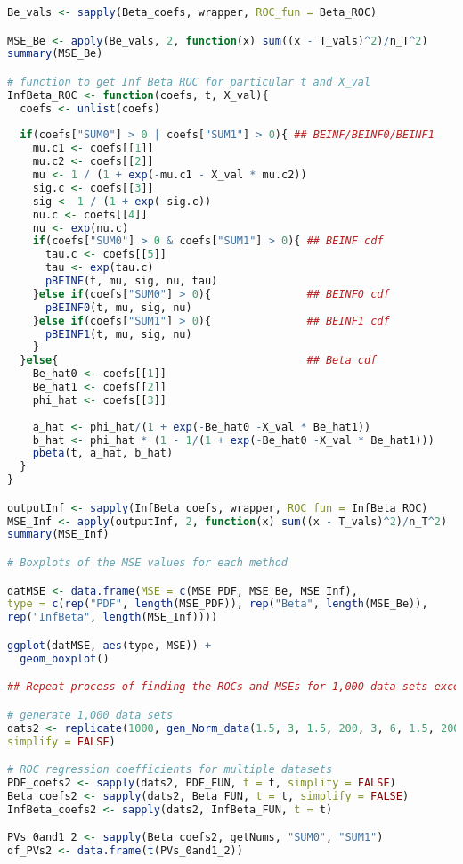 \documentclass{article}
\begin{document}
\begin{lstlisting}[language=R]
Be_vals <- sapply(Beta_coefs, wrapper, ROC_fun = Beta_ROC)

MSE_Be <- apply(Be_vals, 2, function(x) sum((x - T_vals)^2)/n_T^2)
summary(MSE_Be)

# function to get Inf Beta ROC for particular t and X_val
InfBeta_ROC <- function(coefs, t, X_val){
  coefs <- unlist(coefs)
  
  if(coefs["SUM0"] > 0 | coefs["SUM1"] > 0){ ## BEINF/BEINF0/BEINF1
    mu.c1 <- coefs[[1]]
    mu.c2 <- coefs[[2]]
    mu <- 1 / (1 + exp(-mu.c1 - X_val * mu.c2))
    sig.c <- coefs[[3]]
    sig <- 1 / (1 + exp(-sig.c))
    nu.c <- coefs[[4]]
    nu <- exp(nu.c)
    if(coefs["SUM0"] > 0 & coefs["SUM1"] > 0){ ## BEINF cdf
      tau.c <- coefs[[5]]
      tau <- exp(tau.c)
      pBEINF(t, mu, sig, nu, tau)
    }else if(coefs["SUM0"] > 0){               ## BEINF0 cdf
      pBEINF0(t, mu, sig, nu)
    }else if(coefs["SUM1"] > 0){               ## BEINF1 cdf
      pBEINF1(t, mu, sig, nu)
    } 
  }else{                                       ## Beta cdf
    Be_hat0 <- coefs[[1]]
    Be_hat1 <- coefs[[2]]
    phi_hat <- coefs[[3]]
    
    a_hat <- phi_hat/(1 + exp(-Be_hat0 -X_val * Be_hat1))
    b_hat <- phi_hat * (1 - 1/(1 + exp(-Be_hat0 -X_val * Be_hat1)))
    pbeta(t, a_hat, b_hat)
  }
}

outputInf <- sapply(InfBeta_coefs, wrapper, ROC_fun = InfBeta_ROC)
MSE_Inf <- apply(outputInf, 2, function(x) sum((x - T_vals)^2)/n_T^2)
summary(MSE_Inf)

# Boxplots of the MSE values for each method

datMSE <- data.frame(MSE = c(MSE_PDF, MSE_Be, MSE_Inf), 
type = c(rep("PDF", length(MSE_PDF)), rep("Beta", length(MSE_Be)),
rep("InfBeta", length(MSE_Inf))))

ggplot(datMSE, aes(type, MSE)) +
  geom_boxplot()

## Repeat process of finding the ROCs and MSEs for 1,000 data sets except this time under Scenario 2, where the two populations are considerably separated.

# generate 1,000 data sets
dats2 <- replicate(1000, gen_Norm_data(1.5, 3, 1.5, 200, 3, 6, 1.5, 200), 
simplify = FALSE)

# ROC regression coefficients for multiple datasets
PDF_coefs2 <- sapply(dats2, PDF_FUN, t = t, simplify = FALSE)
Beta_coefs2 <- sapply(dats2, Beta_FUN, t = t, simplify = FALSE)
InfBeta_coefs2 <- sapply(dats2, InfBeta_FUN, t = t)

PVs_0and1_2 <- sapply(Beta_coefs2, getNums, "SUM0", "SUM1")
df_PVs2 <- data.frame(t(PVs_0and1_2))


\end{lstlisting}
\end{document}
